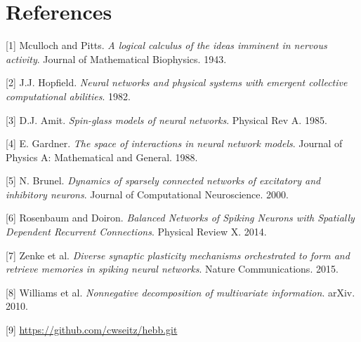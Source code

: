 \documentclass{article} %
\begin{document}
\section*{References}

[1] Mculloch and Pitts. \textit{A logical calculus of the ideas imminent in nervous activity}. Journal of Mathematical Biophysics. 1943.

[2] J.J. Hopfield. \textit{Neural networks and physical systems with emergent collective computational abilities}. 1982.

[3] D.J. Amit. \textit{Spin-glass models of neural networks}. Physical Rev A. 1985.

[4] E. Gardner. \textit{The space of interactions in neural network models}. Journal of Physics A: Mathematical and General. 1988.

[5] N. Brunel. \textit{Dynamics of sparsely connected networks of excitatory and inhibitory neurons}. Journal of Computational Neuroscience. 2000. 

[6] Rosenbaum and Doiron. \textit{Balanced Networks of Spiking Neurons with Spatially Dependent Recurrent Connections}. Physical Review X. 2014.

[7] Zenke et al. \textit{Diverse synaptic plasticity mechanisms
orchestrated to form and retrieve memories
in spiking neural networks}. Nature Communications. 2015.

[8] Williams et al. \textit{Nonnegative decomposition of multivariate information}. arXiv. 2010.

[9] \url{https://github.com/cwseitz/hebb.git}
\end{document}
